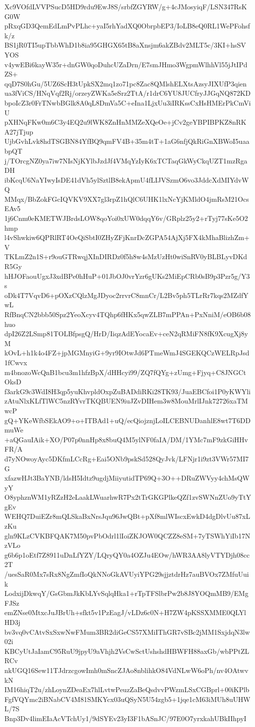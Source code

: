 Xc9VOfdLVVPSucD5HD9rdu9EwJ8S/srbfZGYRW/g+4cJMosyiqF/LSN347RsKG0W
pRxqGD3QemEdLmPvPLhc+yaI5rhYadXQ0ObrpbEP3/IoLB8eQ0RL1WePFohsfk/z
BS1jR0TI5upTbbWhD1b8ia95GHGX65tB8aXnsjm6akZBdv2MLT5c/3KI+hsSVYOS
v4ywEBi6kayW35r+dnGW0qoDuhcUZaDrn/E7smJHmo3WgpmWlhhVl55jJtIPdZS+
qqD7S0hGu/5UZ6ScH3tUpkSX2mq1zo71pc8Zac8QMlshELXtsAzsyJIXUfP3qien
ua3fViCS/HNqVqf2Rj/orzeyZWKa5eSrz2TtA/r1drC6YU8JUCfryJJGqNQ872KD
bpoIcZ3r0FrTNwbBGlk8A0qL8DmVa5C+eIna1LjxUu3iIRKssCxHsHMErPkCmViU
pXHNqFKw0m6C3y4EQ2u9lWK8ZnHnMMZeXQeOe+jCv2geYBPIBPKZ8nRKA27jTjup
UjbGvhLvk8hdTSGBN84YfBQ9qmFV4B+35m4tT+1aG6nfjQkRiGnXBWoI5uaabpQT
j/TOrcgNZ0ya7iw7NIsNjKYlbJzdJf4VMqYzIyK6xTCTaqGkWyCkqUZT1mzRgaDH
ibKcqU6NaYIwyIsDE41dVh5ylSztlB8ekApmU4fLIJVSzmO6vo3JddcXdMIYdvWQ
MMqx/BbZokFGcIQVKV9XX7gl3rpZ1hQlC6UHK1lxNcYjKMldO4jmRsM21OcsEAv5
1j6Cnm0eKMETWJBrdsLOW8qoYoi0xUW0dqqY6v/GRplz25y2+rTyj77sKe5O2hmp
l4vShwkiw6QPRlRT4OeQiSbtI0ZHyZFjKnrDcZGPA54AjXj5FX4kMhaBlizhZm+V
TKLmZ2n1S+r9ouGTRwqjXInDIRDz0f5h8w4sMzUzHt0wiSnRV0yBLBLyvDKdR5Gy
hHJOFaouUgxJ3xdBPe0hHuP+01JbOJ0vrYzr6gUKs2MiEpCRb0sB9p3Pzr5g/Y3s
oDk4T7VqvD6+pOXzCQlzMgJDyoc2rrvrC8mnCr/L2Bv5ph5TLrRr7kqs2MZdfYwL
RfBnqCN2bbb50Spz2YeoXcyv4TQhp6fHKx5qwZLB7mPPAn+PxNniM/eOB6b08huo
dpI26Z2LSmp81TOLBfpsgQ/HrD/IiqzAdEYocaEv+ceN2qRMiFN8fK9XcugXj8yM
kOvL+h1k4o4FZ+jpMGMnyiG+9yr9IOtwJd6PTmeWmJ4SGEKQCzWELRpJsd1fCwvx
m4bnozoWcQnB1bcu3m1hfzBpX/dHHcyi99/ZQ7fQYg+zUmg+Fjyq+C8JNGCtOksD
f3arkG9c3WdI8H3qp5yuKhvpldOxpZuBADdiRKi28TK93/JuaEBCfoi1P0yKWYli
zAtuNlxKLfTlWC5nzRYvrTKQBUEN9iuJZvDIHem3w8MouMrlIJnk72726xaTMwcP
gQ+YKeWfbSEkAO9+o+ITBAd1+uQ/ecQiojznjLoILCEBNUDanhlE8wt7T6DDmuWe
+aQGauIAik+XO/P07p0nnHp8x8buQ4M5ylNF0faIA/DM/1YMc7mF9zkGiHHvFR/A
d7yNOwoyAyc5DKfmLCcRg+Eai5ONb9pskSd528QyJvk/LFNjr1i9zt3VWr57MI7G
xfazwHJt3BaYNB/ldsH5Idtz9ugdjMiiyutidTP69Q+3O++DRuZWVyy4chMsQWyY
O8yphznWM1yRZzH2eLaakLWuarhwR7Px2tTrGKGPlkeQZf1zvSWNnZUo9yTtYgEv
WEHQ7DuiEZr8mQLSkaBxNrsJqu96JwQBt+pXf8mlWIscxEwkD4dgDlvUu87xLzKu
gln9KLzCVKBFQAK7M50pvPbOdrl1lIoiZKJOW0QCZZ8eSM+7yTSWhYiIb17NzVLo
g6b6p1oEtf7Z8911uDnLfYZY/LQryQY0a4OZJu4EOw/hWR3AA8lyVTYDjh08cc2T
/uesSaR0Mx7sRx8NgZmfIoQkNNoGkAVUyiYPG29sjjztdrHz7auBVOx7ZMfuUuik
LodxijDkwqY/GsGbmJkKbLYvSqlqHka1+rTpTFSlbrPw2b8J8YOQmMB9/EMgFJSz
emZNse0MtxcJuJBrUh+sfkt5v1PzEagJ/vLDz6c0N+H7ZW4pKSSXMME0QLYlHD3j
bv3vq0vCAtvSxSxwNwFMum3BR2diGeCS57XMiIThGR7vSBc2jMM1SxjdqN3lw02i
KBCyUtJaIamC95RuU9jpyU9aVhjh2VsCwSctUshshdHBWFH88axGb/wbPPtZLRCv
nkUGQ16Sew11TJdrzcgowImh0mSncZJAo8nblihkO84VdNLwW6oPh/nv4OAtwvkN
IM16hiqT2u/zhLoynZDeaEx7hlLvtwPeuzZaBeQsdvvPWzmLSxCGBprl+00iKPlb
FgfVQYmc2iBNabCV4M81SMKYcx03uQSyN5U54zgb5+1jqe1cM63iMUh8uUHWL/7S
Bnp3Dv4limEIaAcVTchUy1/9dSYEv23yI3F1bASnJC/97E0O7yrxkahUBkIIhpyI
